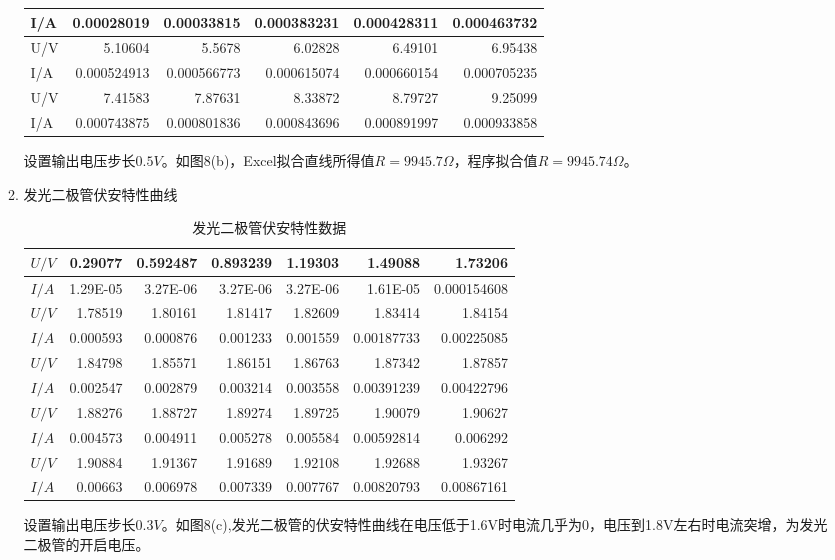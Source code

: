 \documentclass[UTF8]{article}
\begin{document}
\begin{enumerate}
\begin{enumerate}
\begin{table}[H]
\begin{tabular}{|l|r|r|r|r|r|}
            I/A    & 0.00028019 & 0.00033815 & 0.000383231 & 0.000428311 & 0.000463732 \\\hline
            U/V    & 5.10604 & 5.5678 & 6.02828 & 6.49101 & 6.95438 \\\hline
            I/A    & 0.000524913 & 0.000566773 & 0.000615074 & 0.000660154 & 0.000705235 \\\hline
            U/V    & 7.41583 & 7.87631 & 8.33872 & 8.79727 & 9.25099 \\\hline
            I/A    & 0.000743875 & 0.000801836 & 0.000843696 & 0.000891997 & 0.000933858 \\\hline
            \end{tabular}%
          \label{tab:10kOmega}%
        \end{table}%
        设置输出电压步长$0.5V$。如图8(b)，Excel拟合直线所得值$R=9945.7\Omega$，程序拟合值$R=9945.74\Omega$。

        \item 发光二极管伏安特性曲线
        \begin{table}[H]
          \centering
          \caption{发光二极管伏安特性数据}
            \begin{tabular}{|l|r|r|r|r|r|r|}\hline
            $U/V$ & 0.29077 & 0.592487 & 0.893239 & 1.19303 & 1.49088 & 1.73206 \\\hline
            $I/A$ & 1.29E-05 & 3.27E-06 & 3.27E-06 & 3.27E-06 & 1.61E-05 & 0.000154608 \\\hline
            $U/V$ & 1.78519 & 1.80161 & 1.81417 & 1.82609 & 1.83414 & 1.84154 \\\hline
            $I/A$ & 0.000593 & 0.000876 & 0.001233 & 0.001559 & 0.00187733 & 0.00225085 \\\hline
            $U/V$ & 1.84798 & 1.85571 & 1.86151 & 1.86763 & 1.87342 & 1.87857 \\\hline
            $I/A$ & 0.002547 & 0.002879 & 0.003214 & 0.003558 & 0.00391239 & 0.00422796 \\\hline
            $U/V$ & 1.88276 & 1.88727 & 1.89274 & 1.89725 & 1.90079 & 1.90627 \\\hline
            $I/A$ & 0.004573 & 0.004911 & 0.005278 & 0.005584 & 0.00592814 & 0.006292 \\\hline
            $U/V$ & 1.90884 & 1.91367 & 1.91689 & 1.92108 & 1.92688 & 1.93267 \\\hline
            $I/A$ & 0.00663 & 0.006978 & 0.007339 & 0.007767 & 0.00820793 & 0.00867161 \\\hline
            \end{tabular}%
          \label{tab:发光二极管}%
        \end{table}%
        设置输出电压步长$0.3V$。如图8(c),发光二极管的伏安特性曲线在电压低于1.6V时电流几乎为0，电压到1.8V左右时电流突增，为发光二极管的开启电压。


\end{enumerate}
\end{enumerate}
\end{document}
